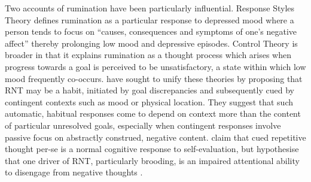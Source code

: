 \documentclass[man,a4paper,biblatex]{apa6}
\begin{document}
Two accounts of rumination have been particularly influential. Response
Styles Theory \parencite{nolen-hoeksema_responses_1991} defines rumination
as a particular response to depressed mood where a person tends to
focus on ``causes, consequences and symptoms of one's negative affect''
\parencite[][p. 117]{smith_roadmap_2009}
 thereby prolonging low mood and depressive episodes.  Control Theory
 \parencite{martin_ruminative_1996} is broader in that it explains
rumination as a thought process which arises when progress towards a
goal is perceived to be unsatisfactory, a state within which low mood
frequently co-occurs. \textcite{watkins_habit-goal_2014} have sought to
unify these theories by proposing that RNT may be a habit, initiated
by goal discrepancies and subsequently cued by contingent contexts
such as mood or physical location.  They suggest that such automatic,
habitual responses come to depend on context more than the content
of particular unresolved goals, especially when contingent responses
involve passive focus on abstractly construed, negative content.
\textcite{koster_understanding_2011} claim that cued repetitive
thought per-se is a normal cognitive response to self-evaluation,
but hypothesise that one driver of RNT, particularly brooding, is
an impaired attentional ability to disengage from negative thoughts
\textcite{koster_understanding_2011}.
\end{document}
